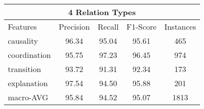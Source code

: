 \begin{table}[ht]
\centering
\begin{tabular}{|l|c|c|c|c|}
\hline

\multicolumn{5}{|c|}{4 Relation Types}                                              \\ \hline
    Features            &     Precision &     Recall &     F1-Score &     Instances \\ \hline
    causality           &     96.34     &     95.04  &     95.61    &     465       \\ \hline
    coordination        &     95.75     &     97.23  &     96.45    &     974       \\ \hline
    transition          &     93.72     &     91.31  &     92.34    &     173       \\ \hline
    explanation         &     97.54     &     94.50  &     95.88    &     201       \\ \hline
    macro-AVG           &     95.84     &     94.52  &     95.07    &     1813      \\ \hline


\end{tabular}
\end{table}
